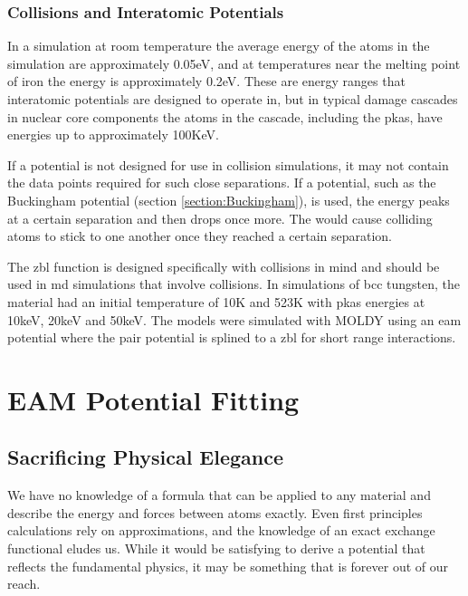 \subsubsection{Collisions and Interatomic Potentials}

In a simulation at room temperature the average energy of the atoms in the simulation are approximately 0.05eV, and at temperatures near the melting point of iron the energy is approximately 0.2eV.  These are energy ranges that interatomic potentials are designed to operate in, but in typical damage cascades in nuclear core components the atoms in the cascade, including the \acrshort{pka}s, have energies up to approximately 100KeV.

If a potential is not designed for use in collision simulations, it may not contain the data points required for such close separations.  If a potential, such as the Buckingham potential (section \ref{section:Buckingham}), is used, the energy peaks at a certain separation and then drops once more.  The would cause colliding atoms to stick to one another once they reached a certain separation.

The \acrshort{zbl} function is designed specifically with collisions in mind and should be used in \acrshort{md} simulations that involve collisions.  In simulations of \acrshort{bcc} tungsten\cite{tungstenfikarschaublin}, the material had an initial temperature of 10K and 523K with \acrshort{pka}s energies at 10keV, 20keV and 50keV.  The models were simulated with MOLDY using an \acrshort{eam} potential where the pair potential is splined to a \acrshort{zbl} for short range interactions.



\FloatBarrier
\section{EAM Potential Fitting}


\subsection{Sacrificing Physical Elegance}

We have no knowledge of a formula that can be applied to any material and describe the energy and forces between atoms exactly.  Even first principles calculations rely on approximations, and the knowledge of an exact exchange functional eludes us.  While it would be satisfying to derive a potential that reflects the fundamental physics, it may be something that is forever out of our reach.

